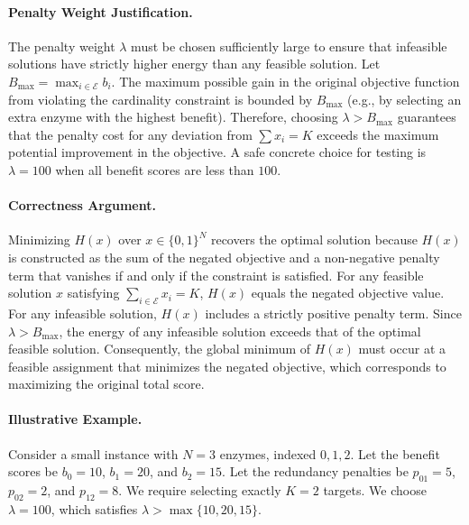 \documentclass[12pt]{article}
\begin{document}
\paragraph{Penalty Weight Justification.}
The penalty weight $\lambda$ must be chosen sufficiently large to ensure that infeasible solutions have strictly higher energy than any feasible solution. Let $B_{\max} = \max_{i \in \mathcal{E}} b_i$. The maximum possible gain in the original objective function from violating the cardinality constraint is bounded by $B_{\max}$ (e.g., by selecting an extra enzyme with the highest benefit). Therefore, choosing $\lambda > B_{\max}$ guarantees that the penalty cost for any deviation from $\sum x_i = K$ exceeds the maximum potential improvement in the objective. A safe concrete choice for testing is $\lambda = 100$ when all benefit scores are less than $100$.

\paragraph{Correctness Argument.}
Minimizing $H(x)$ over $x \in \{0,1\}^N$ recovers the optimal solution because $H(x)$ is constructed as the sum of the negated objective and a non-negative penalty term that vanishes if and only if the constraint is satisfied. For any feasible solution $x$ satisfying $\sum_{i \in \mathcal{E}} x_i = K$, $H(x)$ equals the negated objective value. For any infeasible solution, $H(x)$ includes a strictly positive penalty term. Since $\lambda > B_{\max}$, the energy of any infeasible solution exceeds that of the optimal feasible solution. Consequently, the global minimum of $H(x)$ must occur at a feasible assignment that minimizes the negated objective, which corresponds to maximizing the original total score.

\paragraph{Illustrative Example.}
Consider a small instance with $N=3$ enzymes, indexed $0, 1, 2$. Let the benefit scores be $b_0 = 10$, $b_1 = 20$, and $b_2 = 15$. Let the redundancy penalties be $p_{01} = 5$, $p_{02} = 2$, and $p_{12} = 8$. We require selecting exactly $K=2$ targets. We choose $\lambda = 100$, which satisfies $\lambda > \max\{10, 20, 15\}$.
\end{document}
